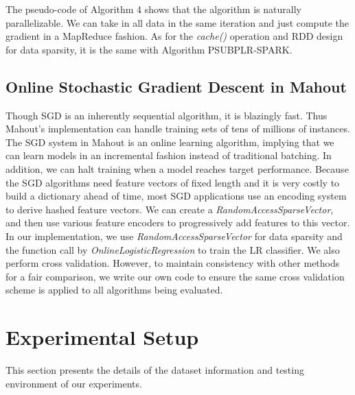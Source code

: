 \documentclass[10pt, conference, compsocconf]{IEEEtran}
\begin{document}
The pseudo-code of Algorithm 4 shows that the algorithm is naturally parallelizable.
We can take in all data in the same iteration and just compute the gradient in a MapReduce fashion.
As for the \textit{cache()} operation and RDD design for data sparsity, it is the same with Algorithm PSUBPLR-SPARK.

\subsection{Online Stochastic Gradient Descent in Mahout}
Though SGD is an inherently sequential algorithm, it is blazingly fast. Thus Mahout's implementation can handle training sets of tens of millions of instances.
The SGD system in Mahout is an online learning algorithm, implying that we can learn models in an incremental fashion instead of traditional batching.
In addition, we can halt training when a model reaches target performance.
Because the SGD algorithms need feature vectors of fixed length and it is very costly to build a dictionary ahead of time, most SGD applications use an encoding system to derive hashed feature vectors. We can create a \textit{RandomAccessSparseVector}, and then use various feature encoders to progressively add features to this vector.
In our implementation, we use \textit{RandomAccessSparseVector} for data sparsity and the function call by \textit{OnlineLogisticRegression} to train the LR classifier.
We also perform cross validation. However, to maintain consistency with other methods for a fair comparison, we write our own code to ensure the same cross validation scheme is applied to all algorithms being evaluated.
	
\section{Experimental Setup} \label{sec:setup}
This section presents the details of the dataset information and testing environment of our experiments.
\end{document}
